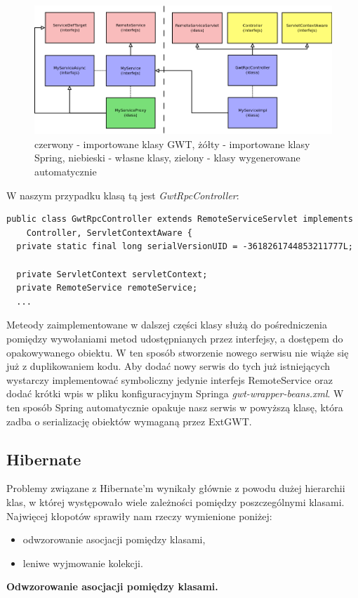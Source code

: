 \documentclass[licencjacka]{pracamgr}
\begin{document}
\begin{figure}[h!]
\centering
\includegraphics[width=\textwidth]{resources/gwt_spring_2.png}
\caption{czerwony - importowane klasy GWT, żółty - importowane klasy Spring, niebieski - własne klasy, zielony - klasy wygenerowane automatycznie}
\end{figure}

W naszym przypadku klasą tą jest \textit{GwtRpcController}: 
\begin{verbatim}
public class GwtRpcController extends RemoteServiceServlet implements
    Controller, ServletContextAware {
  private static final long serialVersionUID = -3618261744853211777L;
          
  private ServletContext servletContext;
  private RemoteService remoteService;
  ...
\end{verbatim}
Meteody zaimplementowane w dalszej części klasy służą do pośredniczenia pomiędzy wywołaniami metod udostępnianych przez interfejsy, a dostępem do opakowywanego obiektu. W ten sposób stworzenie nowego serwisu nie wiąże się już z duplikowaniem kodu. Aby dodać nowy serwis do tych już istniejących wystarczy implementować symboliczny jedynie interfejs RemoteService oraz dodać krótki wpis w pliku konfiguracyjnym Springa \textit{gwt-wrapper-beans.xml}. W ten sposób Spring automatycznie opakuje nasz serwis w powyższą klasę, która zadba o serializację obiektów wymaganą przez ExtGWT. 

\subsection{Hibernate}
Problemy związane z Hibernate'm wynikały głównie z powodu dużej hierarchii klas, w której występowało wiele zależności pomiędzy poszczególnymi klasami. 
Najwięcej kłopotów sprawiły nam rzeczy wymienione poniżej:
\begin{itemize}
\item odwzorowanie asocjacji pomiędzy klasami,
\item leniwe wyjmowanie kolekcji.
\end{itemize}
\textbf{Odwzorowanie asocjacji pomiędzy klasami.}
\end{document}
